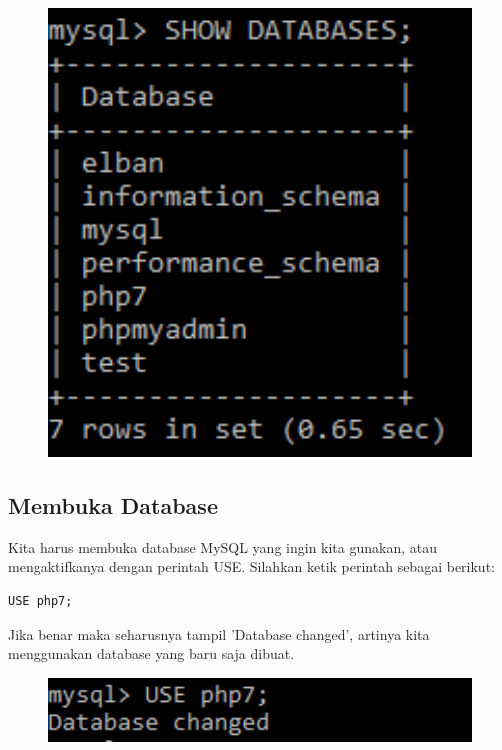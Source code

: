  \begin{figure}[ht]
\centerline{\includegraphics[width=1\textwidth]
{figures/show}}
\caption{}
\label{show}
  \end{figure}

\subsection{Membuka Database}
Kita harus membuka database MySQL yang ingin kita gunakan, atau mengaktifkanya dengan perintah USE. Silahkan ketik perintah sebagai berikut:
\begin{lstlisting}
USE php7;
\end{lstlisting}
Jika benar maka seharusnya tampil 'Database changed', artinya kita menggunakan database yang baru saja dibuat.
 \begin{figure}[ht]
\centerline{\includegraphics[width=1\textwidth]
{figures/use}}
\caption{}
\label{use}
  \end{figure}

